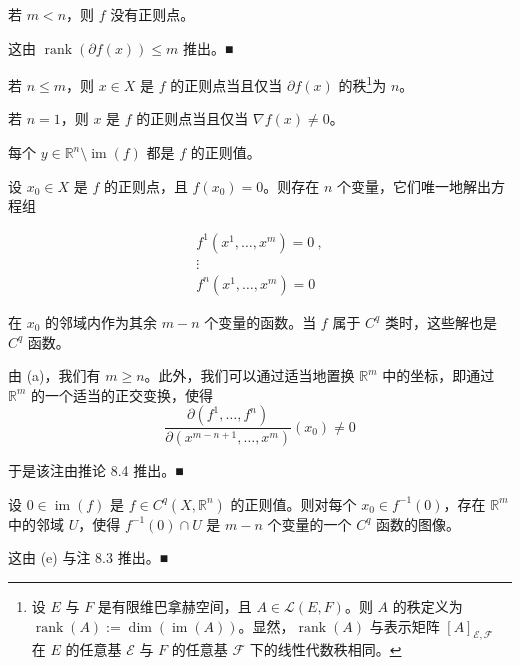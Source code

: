 \begin{remark}

\begin{items}
\item

若 $ m<n $，则 $ f $ 没有正则点。

\proofhead
这由 $ \operatorname{rank}(\partial f(x))\le m $ 推出。\nobreak\hspace{0.35em}■
\item

若 $ n\le m $，则 $ x\in X $ 是 $ f $ 的正则点当且仅当 $ \partial f(x) $ 的秩\footnote{设 $ E $ 与 $ F $ 是有限维巴拿赫空间，且 $ A\in\mathcal{L}(E,F) $。则 $ A $ 的秩定义为 $ \operatorname{rank}(A):=\dim(\operatorname{im}(A)) $。显然，$ \operatorname{rank}(A) $ 与表示矩阵 $ [A]_{\mathcal{E},\mathcal{F}} $ 在 $ E $ 的任意基 $ \mathcal{E} $ 与 $ F $ 的任意基 $ \mathcal{F} $ 下的线性代数秩相同。}为 $ n $。

\item

若 $ n=1 $，则 $ x $ 是 $ f $ 的正则点当且仅当 $ \nabla f(x)\ne 0 $。

\item

每个 $ y\in\mathbb{R}^{n}\setminus\operatorname{im}(f) $ 都是 $ f $ 的正则值。

\item

设 $ x_{0}\in X $ 是 $ f $ 的正则点，且 $ f(x_{0})=0 $。则存在 $ n $ 个变量，它们唯一地解出方程组

\begin{equation*}
\begin{array}{c}f^{1}(x^{1},\ldots,x^{m})=0\ ,\\ \vdots\\ f^{n}(x^{1},\ldots,x^{m})=0\end{array}
\end{equation*}

在 $ x_{0} $ 的邻域内作为其余 $ m-n $ 个变量的函数。当 $ f $ 属于 $ C^{q} $ 类时，这些解也是 $ C^{q} $ 函数。

\proofhead
由 (a)，我们有 $ m\ge n $。此外，我们可以通过适当地置换 $ \mathbb{R}^{m} $ 中的坐标，即通过 $ \mathbb{R}^{m} $ 的一个适当的正交变换，使得
\[
\frac{\partial(f^{1},\ldots,f^{n})}{\partial(x^{m-n+1},\ldots,x^{m})}(x_{0})\ne 0
\]

于是该注由推论 8.4 推出。\nobreak\hspace{0.35em}■

\item

设 $ 0\in\operatorname{im}(f) $ 是 $ f\in C^{q}(X,\mathbb{R}^{n}) $ 的正则值。则对每个 $ x_{0}\in f^{-1}(0) $，存在 $ \mathbb{R}^{m} $ 中的邻域 $ U $，使得 $ f^{-1}(0)\cap U $ 是 $ m-n $ 个变量的一个 $ C^{q} $ 函数的图像。

\proofhead
这由 (e) 与注 8.3 推出。\nobreak\hspace{0.35em}■
\end{items}

\end{remark}


